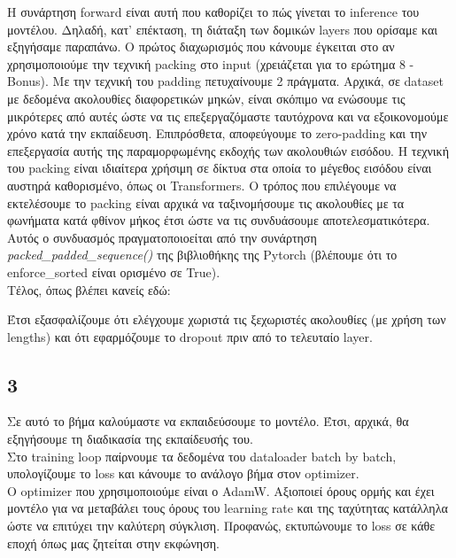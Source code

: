 \noindent Η συνάρτηση forward είναι αυτή που καθορίζει το πώς γίνεται το inference του μοντέλου. Δηλαδή, κατ' επέκταση, τη διάταξη των δομικών layers που ορίσαμε και εξηγήσαμε παραπάνω.
\noindent Ο πρώτος διαχωρισμός που κάνουμε έγκειται στο αν χρησιμοποιούμε την τεχνική packing στο input (χρειάζεται για το ερώτημα 8 - Bonus). Με την τεχνική του padding πετυχαίνουμε 2 πράγματα. Αρχικά, σε dataset με δεδομένα ακολουθίες διαφορετικών μηκών, είναι σκόπιμο να ενώσουμε τις μικρότερες από αυτές ώστε να τις επεξεργαζόμαστε ταυτόχρονα και να εξοικονομούμε χρόνο κατά την εκπαίδευση. Επιπρόσθετα, αποφεύγουμε το zero-padding και την επεξεργασία αυτής της παραμορφωμένης εκδοχής των ακολουθιών εισόδου. Η τεχνική του packing είναι ιδιαίτερα χρήσιμη σε δίκτυα στα οποία το μέγεθος εισόδου είναι αυστηρά καθορισμένο, όπως οι Transformers. 
\noindent Ο τρόπος που επιλέγουμε να εκτελέσουμε το packing είναι αρχικά να ταξινομήσουμε τις ακολουθίες με τα φωνήματα κατά φθίνον μήκος έτσι ώστε να τις συνδυάσουμε αποτελεσματικότερα. Αυτός ο συνδυασμός πραγματοποιοείται από την συνάρτηση \textit{packed\_padded\_sequence()} της βιβλιοθήκης της Pytorch (βλέπουμε ότι το enforce\_sorted είναι ορισμένο σε True). \\

\noindent Τέλος, όπως βλέπει κανείς εδώ:





\noindent Έτσι εξασφαλίζουμε ότι ελέγχουμε χωριστά τις ξεχωριστές ακολουθίες (με χρήση των lengths) και ότι εφαρμόζουμε το dropout πριν από το τελευταίο layer.

\subsection*{3}
Σε αυτό το βήμα καλούμαστε να εκπαιδεύσουμε το μοντέλο. Έτσι, αρχικά, θα εξηγήσουμε τη διαδικασία της εκπαίδευσής του. \\



\noindent Στο training loop παίρνουμε τα δεδομένα του dataloader batch by batch, υπολογίζουμε το loss και κάνουμε το ανάλογο βήμα στον optimizer. \\

\noindent Ο optimizer που χρησιμοποιούμε είναι ο AdamW. Αξιοποιεί όρους ορμής και έχει μοντέλο για να μεταβάλει τους όρους του learning rate και της ταχύτητας κατάλληλα ώστε να επιτύχει την καλύτερη σύγκλιση. Προφανώς, εκτυπώνουμε το loss σε κάθε εποχή όπως μας ζητείται στην εκφώνηση. 

